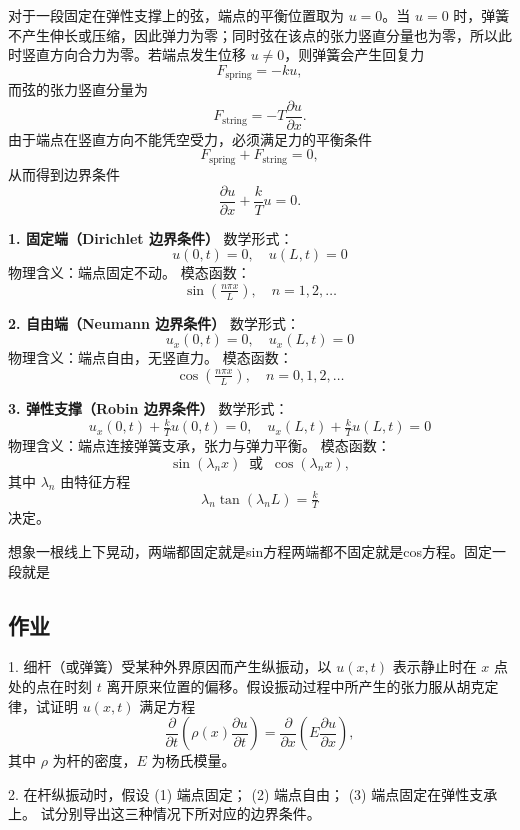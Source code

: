 \begin{dxtips}
   对于一段固定在弹性支撑上的弦，端点的平衡位置取为 $u=0$。当 $u=0$ 时，弹簧不产生伸长或压缩，因此弹力为零；同时弦在该点的张力竖直分量也为零，所以此时竖直方向合力为零。若端点发生位移 $u \neq 0$，则弹簧会产生回复力
\[
F_{\text{spring}} = -k u,
\]
而弦的张力竖直分量为
\[
F_{\text{string}} = -T \frac{\partial u}{\partial x}.
\]
由于端点在竖直方向不能凭空受力，必须满足力的平衡条件
\[
F_{\text{spring}} + F_{\text{string}} = 0,
\]
从而得到边界条件
\[
\frac{\partial u}{\partial x} + \frac{k}{T} u = 0.
\]
\end{dxtips}
\begin{proposition}[常见边界条件及模态函数]

\textbf{1. 固定端（Dirichlet 边界条件）}  
数学形式：
\[
u(0,t)=0,\quad u(L,t)=0
\]
物理含义：端点固定不动。  
模态函数：
\[
\sin\!\left(\tfrac{n\pi x}{L}\right),\quad n=1,2,\dots
\]

\textbf{2. 自由端（Neumann 边界条件）}  
数学形式：
\[
u_x(0,t)=0,\quad u_x(L,t)=0
\]
物理含义：端点自由，无竖直力。  
模态函数：
\[
\cos\!\left(\tfrac{n\pi x}{L}\right),\quad n=0,1,2,\dots
\]

\textbf{3. 弹性支撑（Robin 边界条件）}  
数学形式：
\[
u_x(0,t)+\tfrac{k}{T}u(0,t)=0,\quad
u_x(L,t)+\tfrac{k}{T}u(L,t)=0
\]
物理含义：端点连接弹簧支承，张力与弹力平衡。  
模态函数：
\[
\sin(\lambda_n x)\;\;\text{或}\;\;\cos(\lambda_n x), 
\]
其中 $\lambda_n$ 由特征方程
\[
\lambda_n \tan(\lambda_n L)=\tfrac{k}{T}
\]
决定。

\end{proposition}
\begin{dxtips}
    想象一根线上下晃动，两端都固定就是sin方程两端都不固定就是cos方程。固定一段就是
\end{dxtips}

\subsection{作业}
\begin{exercise}
1. 细杆（或弹簧）受某种外界原因而产生纵振动，以 $u(x,t)$ 表示静止时在 $x$ 点处的点在时刻 $t$ 离开原来位置的偏移。假设振动过程中所产生的张力服从胡克定律，试证明 $u(x,t)$ 满足方程
\[
\frac{\partial}{\partial t}\left(\rho(x)\frac{\partial u}{\partial t}\right)
= \frac{\partial}{\partial x}\left(E\frac{\partial u}{\partial x}\right),
\]
其中 $\rho$ 为杆的密度，$E$ 为杨氏模量。
\end{exercise}
\begin{exercise}
2. 在杆纵振动时，假设  
(1) 端点固定；  
(2) 端点自由；  
(3) 端点固定在弹性支承上。  
试分别导出这三种情况下所对应的边界条件。
\end{exercise}

